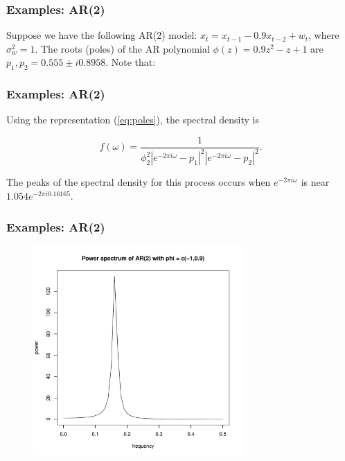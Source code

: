 \documentclass[%
xcolor=pdftex]{beamer}
\begin{document}


\begin{frame}
\frametitle{Examples: AR(2)}

Suppose we have the following AR(2) model: $x_t = x_{t-1} - 0.9 x_{t-2} + w_t$, where $\sigma_w^2 = 1$. The roots (poles) of the AR polynomial $\phi(z) = 0.9z^2 - z + 1$ are $p_1, p_2 = 0.555 \pm i0.8958$. Note that:

\vspace{40mm}

\end{frame}

\begin{frame}
\frametitle{Examples: AR(2)}

Using the representation (\ref{eq:poles}), the spectral density is

$$
f(\omega) = \frac{1}{\phi_2^2 \left \lvert e^{-2 \pi i \omega} - p_1 \right \rvert^2 \left \lvert e^{-2 \pi i \omega} - p_2 \right \rvert^2}.
$$

The peaks of the spectral density for this process occurs when $e^{-2 \pi i \omega}$ is near $1.054e^{-2 \pi i 0.16165}$.

\end{frame}

\begin{frame}
\frametitle{Examples: AR(2)}

\includegraphics[width=100mm, height=80mm]{ar2power.pdf}

\end{frame}
\end{document}
